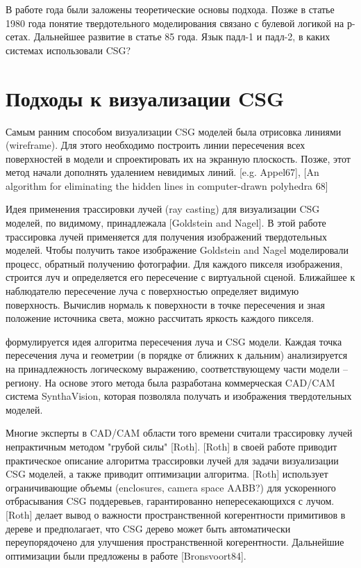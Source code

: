 {{{{{{

В работе \cite{Requicha 77} года были заложены теоретические основы подхода. Позже в статье 1980 года понятие твердотельного моделирования связано с булевой логикой на р-сетах. Дальнейшее развитие в статье 85 года. Язык падл-1 и падл-2, в каких системах использовали CSG?


\section{Подходы к визуализации CSG} \label{sect_csg_vis}



Самым ранним способом визуализации CSG моделей была отрисовка линиями (wireframe). Для этого необходимо построить линии пересечения всех поверхностей в модели и спроектировать их на экранную плоскость. Позже, этот метод начали дополнять удалением невидимых линий. [e.g. Appel67], [An algorithm for eliminating the hidden lines in computer-drawn polyhedra 68]

Идея применения трассировки лучей (ray casting) для визуализации CSG моделей, по видимому, принадлежала [Goldstein and Nagel]. В этой работе трассировка лучей применяется для получения  изображений твердотельных моделей. Чтобы получить такое изображение Goldstein and Nagel моделировали процесс, обратный получению фотографии. Для каждого пикселя изображения, строится луч и определяется его пересечение с виртуальной сценой. Ближайшее к наблюдателю пересечение луча с поверхностью определяет видимую поверхность. Вычислив нормаль к поверхности в точке пересечения и зная положение источника света, можно рассчитать яркость каждого пикселя. 

 формулируется идея алгоритма пересечения луча и CSG модели. Каждая точка пересечения луча и геометрии (в порядке от ближних к дальним) анализируется на принадлежность логическому выражению, соответствующему части модели -- региону. На основе этого метода была разработана коммерческая CAD/CAM система SynthaVision, которая позволяла получать  и  изображения твердотельных моделей.

Многие эксперты в CAD/CAM области того времени считали трассировку лучей непрактичным методом "грубой силы" [Roth]. [Roth] в своей работе приводит практическое описание алгоритма трассировки лучей для задачи визуализации CSG моделей, а также приводит оптимизации алгоритма. [Roth] использует ограничивающие объемы (enclosures, camera space AABB?) для ускоренного отбрасывания CSG поддеревьев, гарантированно непересекающихся с лучом. [Roth] делает вывод о важности пространственной когерентности примитивов в дереве и предполагает, что CSG дерево может быть автоматически переупорядочено для улучшения пространственной когерентности. Дальнейшие оптимизации были предложены в работе [Bronsvoort84].

}}}}}}
